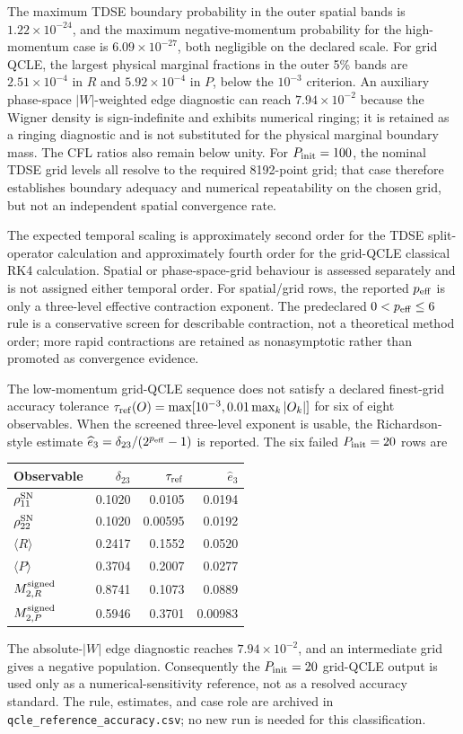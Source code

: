 The maximum TDSE boundary probability in the outer spatial bands is
\(1.22\times10^{-24}\), and the maximum negative-momentum probability for the
high-momentum case is \(6.09\times10^{-27}\), both negligible on the declared
scale. For grid QCLE, the largest physical marginal fractions in the outer
5\% bands are \(2.51\times10^{-4}\) in \(R\) and
\(5.92\times10^{-4}\) in \(P\), below the \(10^{-3}\) criterion. An auxiliary
phase-space \(|W|\)-weighted edge diagnostic can reach \(7.94\times10^{-2}\)
because the Wigner density is sign-indefinite and exhibits numerical ringing;
it is retained as a ringing diagnostic and is not substituted for the physical
marginal boundary mass. The CFL ratios also remain below unity. For
\(P_{\rm init}=100\), the nominal TDSE grid levels all resolve to the required
8192-point grid; that case therefore establishes boundary adequacy and
numerical repeatability on the chosen grid, but not an independent spatial
convergence rate.

The expected temporal scaling is approximately second order for the TDSE
split-operator calculation and approximately fourth order for the grid-QCLE
classical RK4 calculation. Spatial or phase-space-grid behaviour is assessed
separately and is not assigned either temporal order. For spatial/grid rows,
the reported \(p_{\rm eff}\) is only a three-level effective contraction
exponent. The predeclared \(0<p_{\rm eff}\leq6\) rule is a conservative
screen for describable contraction, not a theoretical method order; more
rapid contractions are retained as nonasymptotic rather than promoted as
convergence evidence.

The low-momentum grid-QCLE sequence does not satisfy a declared finest-grid
accuracy tolerance
\(\tau_{\rm ref}(O)=\max[10^{-3},0.01\max_k|O_k|]\) for six of eight
observables. When the screened three-level exponent is usable, the
Richardson-style estimate
\(\widehat e_3=\delta_{23}/(2^{p_{\rm eff}}-1)\) is reported. The six
failed \(P_{\rm init}=20\) rows are
\begin{center}
\small
\begin{tabular}{lrrr}
\toprule
Observable & \(\delta_{23}\) & \(\tau_{\rm ref}\) & \(\widehat e_3\)\\
\midrule
\(\rho_{11}^{\rm SN}\) & 0.1020 & 0.0105 & 0.0194\\
\(\rho_{22}^{\rm SN}\) & 0.1020 & 0.00595 & 0.0192\\
\(\langle R\rangle\) & 0.2417 & 0.1552 & 0.0520\\
\(\langle P\rangle\) & 0.3704 & 0.2007 & 0.0277\\
\(M^{\rm signed}_{2,R}\) & 0.8741 & 0.1073 & 0.0889\\
\(M^{\rm signed}_{2,P}\) & 0.5946 & 0.3701 & 0.00983\\
\bottomrule
\end{tabular}
\end{center}
The absolute-\(|W|\) edge diagnostic reaches \(7.94\times10^{-2}\), and an
intermediate grid gives a negative population. Consequently the
\(P_{\rm init}=20\) grid-QCLE output is used only as a numerical-sensitivity
reference, not as a resolved accuracy standard. The rule, estimates, and
case role are archived in \texttt{qcle\_reference\_accuracy.csv}; no new run
is needed for this classification.

